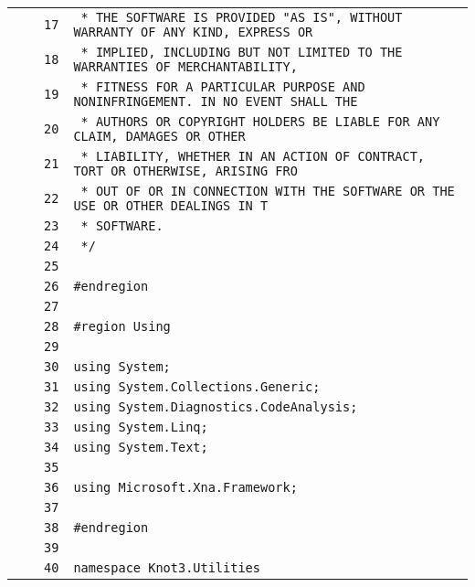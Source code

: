 \documentclass[a4paper,10pt]{article}
\begin{document}
\begin{longtable}[l]{lrrl}
\cellcolor{gray} &  & \verb~17~ & \verb~ * THE SOFTWARE IS PROVIDED "AS IS", WITHOUT WARRANTY OF ANY KIND, EXPRESS OR~\\
\cellcolor{gray} &  & \verb~18~ & \verb~ * IMPLIED, INCLUDING BUT NOT LIMITED TO THE WARRANTIES OF MERCHANTABILITY,~\\
\cellcolor{gray} &  & \verb~19~ & \verb~ * FITNESS FOR A PARTICULAR PURPOSE AND NONINFRINGEMENT. IN NO EVENT SHALL THE~\\
\cellcolor{gray} &  & \verb~20~ & \verb~ * AUTHORS OR COPYRIGHT HOLDERS BE LIABLE FOR ANY CLAIM, DAMAGES OR OTHER~\\
\cellcolor{gray} &  & \verb~21~ & \verb~ * LIABILITY, WHETHER IN AN ACTION OF CONTRACT, TORT OR OTHERWISE, ARISING FRO~\\
\cellcolor{gray} &  & \verb~22~ & \verb~ * OUT OF OR IN CONNECTION WITH THE SOFTWARE OR THE USE OR OTHER DEALINGS IN T~\\
\cellcolor{gray} &  & \verb~23~ & \verb~ * SOFTWARE.~\\
\cellcolor{gray} &  & \verb~24~ & \verb~ */~\\
\cellcolor{gray} &  & \verb~25~ & \verb~~\\
\cellcolor{gray} &  & \verb~26~ & \verb~#endregion~\\
\cellcolor{gray} &  & \verb~27~ & \verb~~\\
\cellcolor{gray} &  & \verb~28~ & \verb~#region Using~\\
\cellcolor{gray} &  & \verb~29~ & \verb~~\\
\cellcolor{gray} &  & \verb~30~ & \verb~using System;~\\
\cellcolor{gray} &  & \verb~31~ & \verb~using System.Collections.Generic;~\\
\cellcolor{gray} &  & \verb~32~ & \verb~using System.Diagnostics.CodeAnalysis;~\\
\cellcolor{gray} &  & \verb~33~ & \verb~using System.Linq;~\\
\cellcolor{gray} &  & \verb~34~ & \verb~using System.Text;~\\
\cellcolor{gray} &  & \verb~35~ & \verb~~\\
\cellcolor{gray} &  & \verb~36~ & \verb~using Microsoft.Xna.Framework;~\\
\cellcolor{gray} &  & \verb~37~ & \verb~~\\
\cellcolor{gray} &  & \verb~38~ & \verb~#endregion~\\
\cellcolor{gray} &  & \verb~39~ & \verb~~\\
\cellcolor{gray} &  & \verb~40~ & \verb~namespace Knot3.Utilities~\\

\end{longtable}
\end{document}
